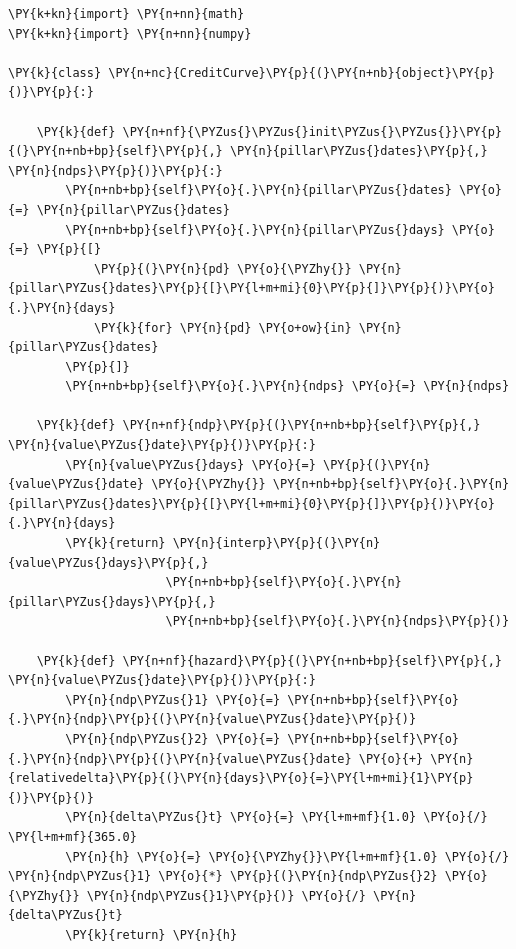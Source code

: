 \begin{tcolorbox}[breakable, size=fbox, boxrule=1pt, pad at break*=1mm,colback=cellbackground, colframe=cellborder]
\begin{Verbatim}[commandchars=\\\{\}]
\PY{k+kn}{import} \PY{n+nn}{math}
\PY{k+kn}{import} \PY{n+nn}{numpy}

\PY{k}{class} \PY{n+nc}{CreditCurve}\PY{p}{(}\PY{n+nb}{object}\PY{p}{)}\PY{p}{:}
    
    \PY{k}{def} \PY{n+nf}{\PYZus{}\PYZus{}init\PYZus{}\PYZus{}}\PY{p}{(}\PY{n+nb+bp}{self}\PY{p}{,} \PY{n}{pillar\PYZus{}dates}\PY{p}{,} \PY{n}{ndps}\PY{p}{)}\PY{p}{:}    
        \PY{n+nb+bp}{self}\PY{o}{.}\PY{n}{pillar\PYZus{}dates} \PY{o}{=} \PY{n}{pillar\PYZus{}dates}
        \PY{n+nb+bp}{self}\PY{o}{.}\PY{n}{pillar\PYZus{}days} \PY{o}{=} \PY{p}{[}
            \PY{p}{(}\PY{n}{pd} \PY{o}{\PYZhy{}} \PY{n}{pillar\PYZus{}dates}\PY{p}{[}\PY{l+m+mi}{0}\PY{p}{]}\PY{p}{)}\PY{o}{.}\PY{n}{days}
            \PY{k}{for} \PY{n}{pd} \PY{o+ow}{in} \PY{n}{pillar\PYZus{}dates}
        \PY{p}{]}
        \PY{n+nb+bp}{self}\PY{o}{.}\PY{n}{ndps} \PY{o}{=} \PY{n}{ndps}
        
    \PY{k}{def} \PY{n+nf}{ndp}\PY{p}{(}\PY{n+nb+bp}{self}\PY{p}{,} \PY{n}{value\PYZus{}date}\PY{p}{)}\PY{p}{:}
        \PY{n}{value\PYZus{}days} \PY{o}{=} \PY{p}{(}\PY{n}{value\PYZus{}date} \PY{o}{\PYZhy{}} \PY{n+nb+bp}{self}\PY{o}{.}\PY{n}{pillar\PYZus{}dates}\PY{p}{[}\PY{l+m+mi}{0}\PY{p}{]}\PY{p}{)}\PY{o}{.}\PY{n}{days}
        \PY{k}{return} \PY{n}{interp}\PY{p}{(}\PY{n}{value\PYZus{}days}\PY{p}{,}
                      \PY{n+nb+bp}{self}\PY{o}{.}\PY{n}{pillar\PYZus{}days}\PY{p}{,}
                      \PY{n+nb+bp}{self}\PY{o}{.}\PY{n}{ndps}\PY{p}{)}
    
    \PY{k}{def} \PY{n+nf}{hazard}\PY{p}{(}\PY{n+nb+bp}{self}\PY{p}{,} \PY{n}{value\PYZus{}date}\PY{p}{)}\PY{p}{:}
        \PY{n}{ndp\PYZus{}1} \PY{o}{=} \PY{n+nb+bp}{self}\PY{o}{.}\PY{n}{ndp}\PY{p}{(}\PY{n}{value\PYZus{}date}\PY{p}{)}
        \PY{n}{ndp\PYZus{}2} \PY{o}{=} \PY{n+nb+bp}{self}\PY{o}{.}\PY{n}{ndp}\PY{p}{(}\PY{n}{value\PYZus{}date} \PY{o}{+} \PY{n}{relativedelta}\PY{p}{(}\PY{n}{days}\PY{o}{=}\PY{l+m+mi}{1}\PY{p}{)}\PY{p}{)}
        \PY{n}{delta\PYZus{}t} \PY{o}{=} \PY{l+m+mf}{1.0} \PY{o}{/} \PY{l+m+mf}{365.0}
        \PY{n}{h} \PY{o}{=} \PY{o}{\PYZhy{}}\PY{l+m+mf}{1.0} \PY{o}{/} \PY{n}{ndp\PYZus{}1} \PY{o}{*} \PY{p}{(}\PY{n}{ndp\PYZus{}2} \PY{o}{\PYZhy{}} \PY{n}{ndp\PYZus{}1}\PY{p}{)} \PY{o}{/} \PY{n}{delta\PYZus{}t}
        \PY{k}{return} \PY{n}{h}
\end{Verbatim}
\end{tcolorbox}    

